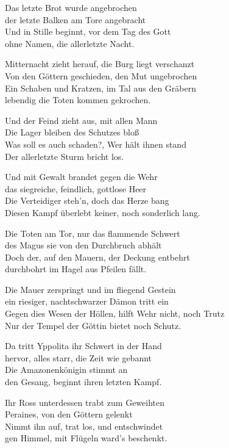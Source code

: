 Das letzte Brot wurde angebrochen\\
der letzte Balken am Tore angebracht\\
Und in Stille beginnt, vor dem Tag des Gott\\
ohne Namen, die allerletzte Nacht.

Mitternacht zieht herauf, die Burg liegt verschanzt\\
Von den Göttern geschieden, den Mut ungebrochen\\
Ein Schaben und Kratzen, im Tal aus den Gräbern\\
lebendig die Toten kommen gekrochen.

Und der Feind zieht aus, mit allen Mann\\
Die Lager bleiben des Schutzes bloß\\
Was soll es auch schaden?, Wer hält ihnen stand\\
Der allerletzte Sturm bricht los.

Und mit Gewalt brandet gegen die Wehr\\
das siegreiche, feindlich, gottlose Heer\\
Die Verteidiger steh'n, doch das Herze bang\\
Diesen Kampf überlebt keiner, noch sonderlich lang.

Die Toten am Tor, nur das flammende Schwert\\
des Magus sie von den Durchbruch abhält\\
Doch der, auf den Mauern, der Deckung entbehrt\\
durchbohrt im Hagel aus Pfeilen fällt.

Die Mauer zerspringt und im fliegend Gestein\\
ein riesiger, nachtschwarzer Dämon tritt ein\\
Gegen dies Wesen der Höllen, hilft Wehr nicht, noch Trutz\\
Nur der Tempel der Göttin bietet noch Schutz.

Da tritt Yppolita ihr Schwert in der Hand\\
hervor, alles starr, die Zeit wie gebannt\\
Die Amazonenkönigin stimmt an\\
den Gesang, beginnt ihren letzten Kampf.

Ihr Ross unterdessen trabt zum Geweihten\\
Peraines, von den Göttern gelenkt\\
Nimmt ihn auf, trat los, und entschwindet\\
gen Himmel, mit Flügeln ward's beschenkt.

